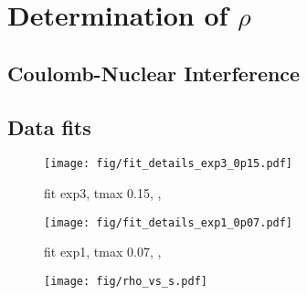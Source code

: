 \section{Determination of $\rho$}
\label{sec:rho}

\subsection{Coulomb-Nuclear Interference}
\label{sec:rho cni}


\subsection{Data fits}
\label{sec:rho anal}




\begin{figure*}
\vskip-5mm
\begin{center}
\texttt{[image: fig/fit\_details\_exp3\_0p15.pdf]}
\caption{%
fit exp3, tmax 0.15,
,
}
\label{fig:fit exp3 0.15}
\end{center}
\end{figure*}



\begin{figure*}
\vskip-5mm
\begin{center}
\texttt{[image: fig/fit\_details\_exp1\_0p07.pdf]}
\caption{%
fit exp1, tmax 0.07,
,
}
\label{fig:fit exp1 0.07}
\end{center}
\end{figure*}




\begin{figure*}
\vskip-5mm
\begin{center}
\texttt{[image: fig/rho\_vs\_s.pdf]}
\caption{%
}
\label{fig:rho_vs_s}
\end{center}
\end{figure*}
